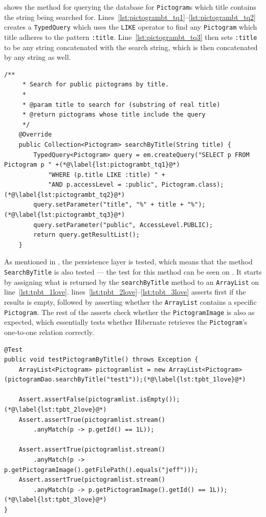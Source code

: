 \bigskip
{} shows the method for querying the database for \texttt{Pictogram}s which title contains the string being searched for.
Lines~\ref{lst:pictogrambt_tq1}--\ref{lst:pictogrambt_tq2} creates a \texttt{TypedQuery} which uses the \texttt{LIKE} operator to find any \texttt{Pictogram} which title adheres to the pattern \texttt{:title}.
Line~\ref{lst:pictogrambt_tq3} then sets \texttt{:title} to be any string concatenated with the search string, which is then concatenated by any string as well.
\begin{lstlisting}[float, floatplacement=h, caption={The method which searches through all \texttt{Pictogram}s by their titles.},label={lst:pictogramByTitle}]
    /**
     * Search for public pictograms by title.
     *
     * @param title to search for (substring of real title)
     * @return pictograms whose title include the query
     */
    @Override
    public Collection<Pictogram> searchByTitle(String title) {
        TypedQuery<Pictogram> query = em.createQuery("SELECT p FROM Pictogram p " +(*@\label{lst:pictogrambt_tq1}@*)
            "WHERE (p.title LIKE :title) " +
            "AND p.accessLevel = :public", Pictogram.class);(*@\label{lst:pictogrambt_tq2}@*)
        query.setParameter("title", "%" + title + "%");(*@\label{lst:pictogrambt_tq3}@*)
        query.setParameter("public", AccessLevel.PUBLIC);
        return query.getResultList();
    }
\end{lstlisting}

As mentioned in , the persistence layer is tested, which means that the method \texttt{SearchByTitle} is also tested --- the test for this method can be seen on .
It starts by assigning what is returned by the \texttt{searchByTitle} method to an \texttt{ArrayList} on line~\ref{lst:tpbt_1love}.
lines~\ref{lst:tpbt_2love}--\ref{lst:tpbt_3love} asserts first if the results is empty, followed by asserting whether the \texttt{ArrayList} contains a specific \texttt{Pictogram}.
The rest of the asserts check whether the \texttt{PictogramImage} is also as expected, which essentially tests whether Hibernate retrieves the \texttt{Pictogram}'s one-to-one relation correctly.

\begin{lstlisting}[float, floatplacement=h, caption={The test method which tests the method \texttt{SearchByTitle}.},label={lst:pictogramByTitleTest}]
@Test
public void testPictogramByTitle() throws Exception {
    ArrayList<Pictogram> pictogramlist = new ArrayList<Pictogram>(pictogramDao.searchByTitle("test1"));(*@\label{lst:tpbt_1love}@*)

    Assert.assertFalse(pictogramlist.isEmpty());(*@\label{lst:tpbt_2love}@*)
    Assert.assertTrue(pictogramlist.stream()
    	.anyMatch(p -> p.getId() == 1L));

    Assert.assertTrue(pictogramlist.stream()
    	.anyMatch(p -> p.getPictogramImage().getFilePath().equals("jeff")));
    Assert.assertTrue(pictogramlist.stream()
    	.anyMatch(p -> p.getPictogramImage().getId() == 1L));(*@\label{lst:tpbt_3love}@*)
}
\end{lstlisting}

